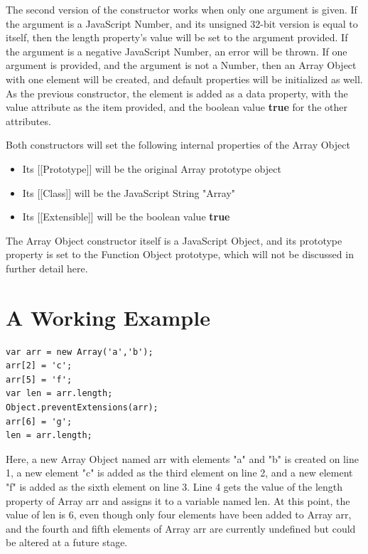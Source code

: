 \documentclass[a4paper,11pt,twoside]{report}
\begin{document}
The second version of the constructor works when only one argument is given. If the argument is a JavaScript Number, and its unsigned 32-bit version is equal to itself, then the length property's value will be set to the argument provided. If the argument is a negative JavaScript Number, an error will be thrown. If one argument is provided, and the argument is not a Number, then an Array Object with one element will be created, and default properties will be initialized as well. As the previous constructor, the element is added as a data property, with the value attribute as the item provided, and the boolean value \textbf{true} for the other attributes. 

Both constructors will set the following internal properties of the Array Object
\begin{itemize}
\item Its [[Prototype]] will be the original Array prototype object
\item Its [[Class]] will be the JavaScript String "Array"
\item Its [[Extensible]] will be the boolean value \textbf{true}
\end{itemize}

The Array Object constructor itself is a JavaScript Object, and its prototype property is set to the Function Object prototype, which will not be discussed in further detail here.

\section{A Working Example}
\begin{center}
\begin{minipage}{10cm}
\begin{lstlisting}
var arr = new Array('a','b');
arr[2] = 'c';
arr[5] = 'f';
var len = arr.length;
Object.preventExtensions(arr);
arr[6] = 'g';
len = arr.length;
\end{lstlisting}
\end{minipage}
\end{center}

Here, a new Array Object named arr with elements "a" and "b" is created on line 1, a new element "c" is added as the third element on line 2, and a new element "f" is added as the sixth element on line 3. Line 4 gets the value of the length property of Array arr and assigns it to a variable named len. At this point, the value of len is 6, even though only four elements have been added to Array arr, and the fourth and fifth elements of Array arr are currently undefined but could be altered at a future stage.
\end{document}
